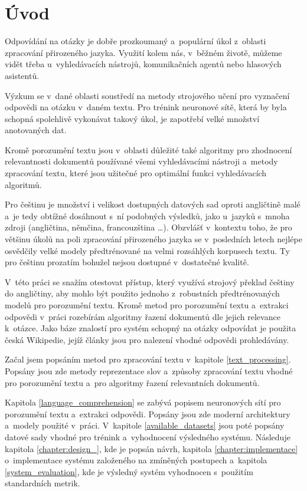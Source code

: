 
\chapter{Úvod}
Odpovídání na otázky je dobře prozkoumaný a~populární úkol z~oblasti zpracování přirozeného jazyka. Využití kolem nás, v~běžném životě, můžeme vidět třeba u~vyhledávacích nástrojů, komunikačních agentů nebo hlasových asistentů.\par 
Výzkum se v~dané oblasti soustředí na metody strojového učení pro vyznačení odpovědi na otázku v~daném textu. Pro trénink neuronové sítě, která by byla schopná spolehlivě vykonávat takový úkol, je zapotřebí velké množství anotovaných dat.\par 
Kromě porozumění textu jsou v~oblasti důležité také algoritmy pro zhodnocení relevantnosti dokumentů používané všemi vyhledávacími nástroji a~metody zpracování textu, které jsou užitečné pro optimální funkci vyhledávacích algoritmů.\par
Pro češtinu je množství i velikost dostupných datových sad oproti angličtině malé a~je tedy obtížné dosáhnout s~ní podobných výsledků, jako u~jazyků s~mnoha zdroji (angličtina, němčina, francouzština \dots). Obzvlášť v~kontextu toho, že pro většinu úkolů na poli zpracování přirozeného jazyka se v~posledních letech nejlépe osvědčily velké modely předtrénované na velmi rozsáhlých korpusech textu. Ty pro češtinu prozatím bohužel nejsou dostupné v~dostatečné kvalitě.\par
V~této práci se snažím otestovat přístup, který využívá strojový překlad češtiny do angličtiny, aby mohlo být použito jednoho z~robustních předtrénovaných modelů pro porozumění textu. Kromě metod pro porozumění textu a~extrakci odpovědi v~práci rozebírám algoritmy řazení dokumentů dle jejich relevance k~otázce. Jako báze znalostí pro systém schopný na otázky odpovídat je použita česká Wikipedie, jejíž články jsou pro nalezení vhodné odpovědi prohledávány.\par
Začal jsem popsáním metod pro zpracování textu v~kapitole \ref{text_processing}. Popsány jsou zde metody reprezentace slov a~způsoby zpracování textu vhodné pro porozumění textu a~pro algoritmy řazení relevantních dokumentů.\par
Kapitola \ref{language_comprehension} se zabývá popisem neuronových sítí pro porozumění textu a~extrakci odpovědi. Popsány jsou zde moderní architektury a~modely použité v~práci. V~kapitole \ref{available_datasets} jsou poté popsány datové sady vhodné pro trénink a~vyhodnocení výsledného systému.
Následuje kapitola \ref{chapter:design_}, kde je popsán návrh, kapitola \ref{chapter:implementace} o~implementace systému založeného na zmíněných postupech a~kapitola \ref{system_evaluation}, kde je výsledný systém vyhodnocen s~použitím standardních metrik.




